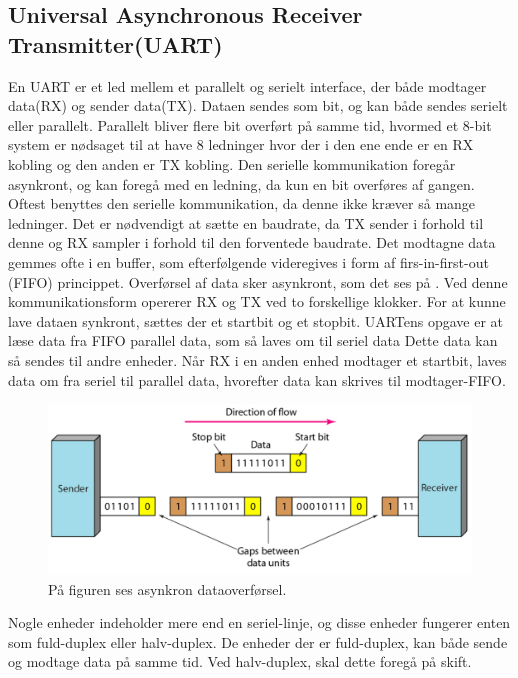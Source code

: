 \subsection{Universal Asynchronous Receiver Transmitter(UART)}
En UART er et led mellem et parallelt og serielt interface, der både modtager data(RX) og sender data(TX). Dataen sendes som bit, og kan både sendes serielt eller parallelt.\citep{Jimb02016a}\newline 
Parallelt bliver flere bit overført på samme tid, hvormed et 8-bit system er nødsaget til at have 8 ledninger hvor der i den ene ende er en RX kobling og den anden er TX kobling.\citep{Jimb02016a}\newline
Den serielle kommunikation foregår asynkront, og kan foregå med en ledning, da kun en bit overføres af gangen. Oftest benyttes den serielle kommunikation, da denne ikke kræver så mange ledninger.  Det er nødvendigt at sætte en baudrate, da TX sender i forhold til denne og RX sampler i forhold til den forventede baudrate. Det modtagne data gemmes ofte i en buffer, som efterfølgende videregives i form af firs-in-first-out (FIFO) princippet.\citep{Jimb02016a,Chun-zhiYin-shuiLun-yao2011}\newline 
Overførsel af data sker asynkront, som det ses på . Ved denne kommunikationsform opererer RX og TX ved to forskellige klokker. For at kunne lave dataen synkront, sættes der et startbit og et stopbit. UARTens opgave er at læse data fra FIFO parallel data, som så laves om til seriel data Dette data kan så sendes til andre enheder. Når RX i en anden enhed modtager et startbit, laves data om fra seriel til parallel data, hvorefter data kan skrives til modtager-FIFO.\citep{Jimb02016a,Chun-zhiYin-shuiLun-yao2011} 

\begin{figure}[H]
	\centering
	\includegraphics[scale=0.6]{figures/bProblemloesning/asynkron.png}
	\caption{På figuren ses asynkron dataoverførsel.\citep{Sharma2016}}
	\label{fig:asynkron}
\end{figure}

Nogle enheder indeholder mere end en seriel-linje, og disse enheder fungerer enten som fuld-duplex eller halv-duplex. De enheder der er fuld-duplex, kan både sende og modtage data på samme tid. Ved halv-duplex, skal dette foregå på skift.\citep{Jimb02016a} 